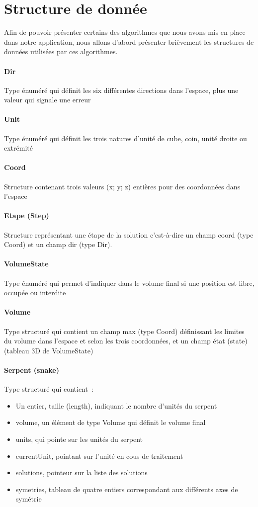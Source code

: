 \section{Structure de donnée}
Afin de pouvoir présenter certains des algorithmes que nous avons mis en place dans notre application, nous allons d'abord présenter brièvement les structures de données utilisées par ces algorithmes.

\paragraph{Dir} Type énuméré qui définit les six différentes directions dans l’espace, plus une valeur qui signale une erreur
\paragraph{Unit} Type énuméré qui définit les trois natures d’unité de cube, coin, unité droite ou extrémité
\paragraph{Coord} Structure contenant trois valeurs (x; y; z) entières pour des coordonnées dans l’espace
\paragraph{Etape (Step)} Structure représentant une étape de la solution c’est-à-dire un champ coord (type Coord) et un champ dir (type Dir).
\paragraph{VolumeState} Type énuméré qui permet d’indiquer dans le volume final si une position est libre, occupée ou interdite
\paragraph{Volume} Type structuré qui contient un champ max (type Coord) définissant les limites du volume dans l’espace et selon les trois coordonnées, et un champ état (state) (tableau 3D de VolumeState)
\paragraph{Serpent (snake)} Type structuré qui contient : 
\begin{itemize}
 \item Un entier, taille (length), indiquant le nombre d’unités du serpent 
 \item volume, un élément de type Volume qui définit le volume final
 \item units, qui pointe sur les unités du serpent 
 \item currentUnit, pointant sur l’unité en cous de traitement 
 \item solutions, pointeur sur la liste des solutions 
 \item symetries, tableau de quatre entiers correspondant aux différents axes de symétrie
\end{itemize}
